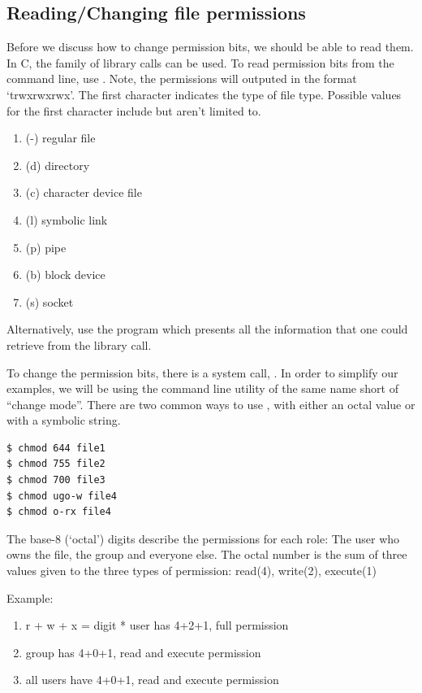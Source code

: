 \subsection{Reading/Changing file permissions}

Before we discuss how to change permission bits, we should be able to read them.
In C, the  family of library calls can be used.
To read permission bits from the command line, use .
Note, the permissions will outputed in the format `trwxrwxrwx'.
The first character indicates the type of file type.
Possible values for the first character include but aren't limited to.

\begin{enumerate}
\item (-) regular file
\item (d) directory
\item (c) character device file
\item (l) symbolic link
\item (p) pipe
\item (b) block device
\item (s) socket
\end{enumerate}

Alternatively, use the program  which presents all the information that one could retrieve from the  library call.

To change the permission bits, there is a system call, .
In order to simplify our examples, we will be using the command line utility of the same name  short of ``change mode''.
There are two common ways to use , with either an octal value or with a symbolic string.

\begin{verbatim}
$ chmod 644 file1
$ chmod 755 file2
$ chmod 700 file3
$ chmod ugo-w file4
$ chmod o-rx file4
\end{verbatim}

The base-8 (`octal') digits describe the permissions for each role: The user who owns the file, the group and everyone else.
The octal number is the sum of three values given to the three types of permission: read(4), write(2), execute(1)

Example: 

\begin{enumerate}
\item r + w + x = digit * user has 4+2+1, full permission
\item group has 4+0+1, read and execute permission
\item all users have 4+0+1, read and execute permission
\end{enumerate}

